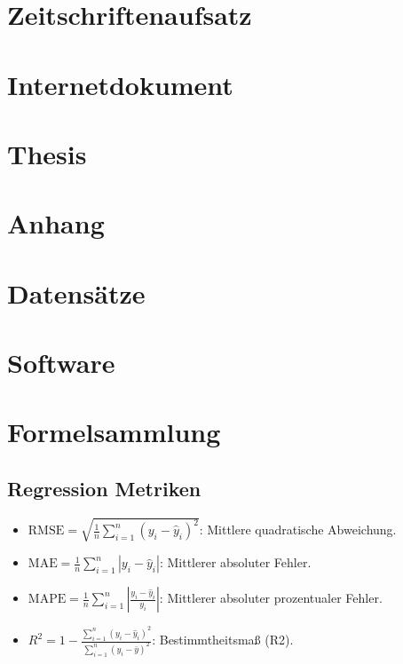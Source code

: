 \documentclass[headsepline,footsepline,footinclude=false,oneside,fontsize=11pt,paper=a4,listof=totoc,bibliography=totoc]{scrbook} %
\begin{document}
\section*{Zeitschriftenaufsatz}
\printbibliography[filter=zeitschriftenaufsatzfilter, heading=none]

\section*{Internetdokument}
\printbibliography[filter=internetdokumentfilter, heading=none]

\section*{Thesis}
\printbibliography[filter=thesisfilter, heading=none]

\printglossary[title=Glossar, toctitle=Glossar]

\newline

\section*{Anhang}

\section*{Datensätze}\label{datensaetze}
\printbibliography[filter=datensatzfilter, heading=none]

\section*{Software}
\printbibliography[filter=softwarefilter, heading=none]

\printbibliography[filter=repositoryfilter, heading=none]

\section*{Formelsammlung}

\subsection*{Regression Metriken}
\begin{itemize}
  \item \( \text{RMSE} = \sqrt{\frac{1}{n} \sum_{i=1}^{n} (y_i - \hat{y}_i)^2} \): Mittlere quadratische Abweichung.
  \item \( \text{MAE} = \frac{1}{n} \sum_{i=1}^{n} |y_i - \hat{y}_i| \): Mittlerer absoluter Fehler.
  \item \( \text{MAPE} = \frac{1}{n} \sum_{i=1}^{n} \left| \frac{y_i - \hat{y}_i}{y_i} \right| \): Mittlerer absoluter prozentualer Fehler.
  \item \( R^2 = 1 - \frac{\sum_{i=1}^{n} (y_i - \hat{y}_i)^2}{\sum_{i=1}^{n} (y_i - \bar{y})^2} \): Bestimmtheitsmaß (R2).
\end{itemize}
\end{document}

